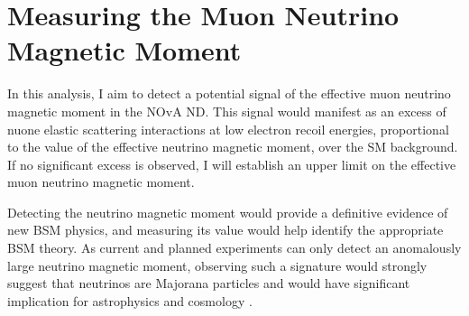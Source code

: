 \chapter{Measuring the Muon Neutrino Magnetic Moment}\label{sec:NeutrinoMagMoment}

In this analysis, I aim to detect a potential signal of the effective muon neutrino magnetic moment in the \gls{NOvA} \gls{ND}. This signal would manifest as an excess of \gls{nuone} elastic scattering interactions at low electron recoil energies, proportional to the value of the effective neutrino magnetic moment, over the \gls{SM} background. If no significant excess is observed, I will establish an upper limit on the effective muon neutrino magnetic moment.



Detecting the neutrino magnetic moment would provide a definitive evidence of new \gls{BSM} physics, and measuring its value would help identify the appropriate \gls{BSM} theory. As current and planned experiments can only detect an anomalously large neutrino magnetic moment, observing such a signature would strongly suggest that neutrinos are Majorana particles and would have significant implication for astrophysics and cosmology \cite{SnowmassNeutrinoFrontierReport.pdf}.



